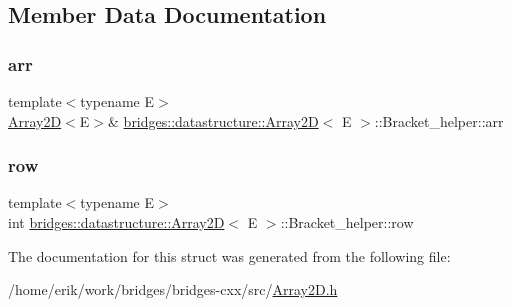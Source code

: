 \subsection{Member Data Documentation}
\mbox{\label{structbridges_1_1datastructure_1_1_array2_d_1_1_bracket__helper_a77fc2a11bc16c90eadfc0369c6f2979b}} 
\subsubsection{\texorpdfstring{arr}{arr}}
{\footnotesize\ttfamily template$<$typename E$>$ \\
\hyperlink{classbridges_1_1datastructure_1_1_array2_d}{Array2D}$<$E$>$\& \hyperlink{classbridges_1_1datastructure_1_1_array2_d}{bridges\+::datastructure\+::\+Array2D}$<$ E $>$\+::Bracket\+\_\+helper\+::arr}

\mbox{\label{structbridges_1_1datastructure_1_1_array2_d_1_1_bracket__helper_a6f09a65776d572d4fdfedb6c3a822e2a}} 
\subsubsection{\texorpdfstring{row}{row}}
{\footnotesize\ttfamily template$<$typename E$>$ \\
int \hyperlink{classbridges_1_1datastructure_1_1_array2_d}{bridges\+::datastructure\+::\+Array2D}$<$ E $>$\+::Bracket\+\_\+helper\+::row}



The documentation for this struct was generated from the following file\+:\begin{DoxyCompactItemize}
\item 
/home/erik/work/bridges/bridges-\/cxx/src/\hyperlink{_array2_d_8h}{Array2\+D.\+h}\end{DoxyCompactItemize}
